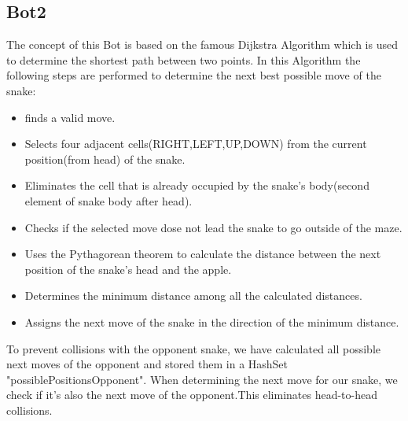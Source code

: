 \documentclass[a4paper,12pt]{article}
\begin{document}
\subsection{Bot2}
The concept of this Bot is based on the famous Dijkstra Algorithm which is used to determine the shortest path between two points.
In this Algorithm the following steps are performed to determine the next best possible move of the snake:
\begin{itemize}
\item finds a valid move.
\item Selects four adjacent cells(RIGHT,LEFT,UP,DOWN) from the current position(from head) of the snake.
\item Eliminates the cell that is already occupied by the snake's body(second element of snake body after head).
\item Checks if the selected move dose not lead the snake to go outside of the maze.
\item Uses the Pythagorean theorem to calculate the distance between the next position of the snake's head and the apple.
\item Determines the minimum distance among all the calculated distances.
\item Assigns the next move of the snake in the direction of the minimum distance.
\end{itemize}
To prevent collisions with the opponent snake, we have calculated all possible next moves of the opponent and stored them in a HashSet "possiblePositionsOpponent".
When determining the next move for our snake, we check if it's also the next move of the opponent.This eliminates head-to-head collisions.
\end{document}
